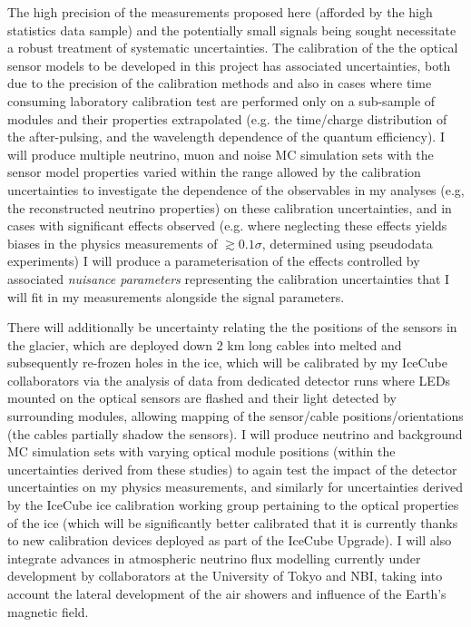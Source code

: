 \documentclass[a4paper,11pt]{article}
\begin{document}
The high precision of the measurements proposed here (afforded by the high statistics data sample) and the potentially small signals being sought necessitate a robust treatment of systematic uncertainties. The calibration of the 
the optical sensor models to be developed in this project has associated uncertainties, both due to the precision of the calibration methods and also in cases where time consuming laboratory calibration test are performed only on a sub-sample of modules and their properties extrapolated (e.g. the time/charge distribution of the after-pulsing, and the wavelength dependence of the quantum efficiency). I will produce multiple neutrino, muon and noise MC simulation sets with the sensor model properties varied within the range allowed by the calibration uncertainties to investigate the dependence of the observables in my analyses (e.g, the reconstructed neutrino properties) on these calibration uncertainties, and in cases with significant effects observed (e.g. where neglecting these effects yields biases in the physics measurements of $\gtrsim 0.1 \sigma$, determined using pseudodata experiments) I will produce a parameterisation of the effects controlled by associated \textit{nuisance parameters} representing the calibration uncertainties that I will fit in my measurements alongside the signal parameters.

There will additionally be uncertainty relating the the positions of the sensors in the glacier, which are deployed down 2 km long cables into melted and subsequently re-frozen holes in the ice, which will be calibrated by my IceCube collaborators via the analysis of data from dedicated detector runs where LEDs mounted on the optical sensors are flashed and their light detected by surrounding modules, allowing mapping of the sensor/cable positions/orientations (the cables partially shadow the sensors). I will produce neutrino and background MC simulation sets with varying optical module positions (within the uncertainties derived from these studies) to again test the impact of the detector uncertainties on my physics measurements, and similarly for uncertainties derived by the IceCube ice calibration working group pertaining to the optical properties of the ice (which will be significantly better calibrated that it is currently thanks to new calibration devices deployed as part of the IceCube Upgrade). I will also integrate advances in atmospheric neutrino flux modelling currently under development by collaborators at the University of Tokyo and NBI, taking into account the lateral development of the air showers and influence of the Earth's magnetic field.
\end{document}
